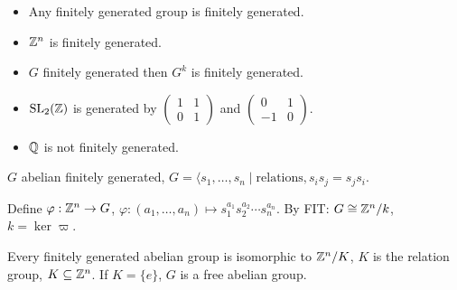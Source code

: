 \documentclass[10pt, a4paper]{article}
\begin{document}
\begin{example}\phantom{}
    \begin{itemize}
        \item Any finitely generated group is finitely generated.
        
        \item $\mathbb{Z} ^ n$ is finitely generated.

        \item $G$ finitely generated then $G ^ k$ is finitely generated.

        \item $\mathrm{SL}_2(\mathbb{Z})$ is generated by $\begin{pmatrix}
            1 & 1 \\ 0 & 1
        \end{pmatrix}$ and $\begin{pmatrix}
            0 & 1 \\ -1 & 0
        \end{pmatrix}$.

        \item $\mathbb{Q}$ is not finitely generated.
    \end{itemize}
\end{example}

$G$ abelian finitely generated,
$G = \langle s_1, \dotsc, s_n \mid \text{relations}, s_is_j = s_js_i$.

Define $\varphi : \mathbb{Z} ^ n \to G$,
$\varphi : (a_1, \dotsc, a_n) \mapsto s_1 ^ {a_1}s_2 ^ {a_2} \dotsi s_n ^ {a_n}$.
By FIT:
$G \cong \mathbb{Z} ^ n / k$,
$k = \ker{\varpi}$.

\begin{theorem}
    Every finitely generated abelian group is isomorphic to $\mathbb{Z} ^ n / K$,
    $K$ is the relation group,
    $K \subseteq \mathbb{Z} ^ n$.
    If $K = \{e\}$,
    $G$ is a free abelian group.
\end{theorem}
\end{document}
